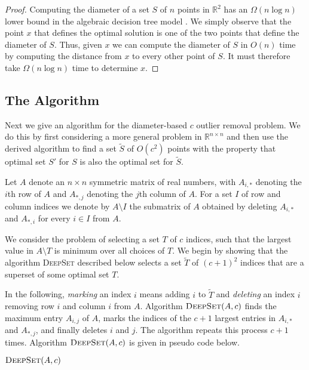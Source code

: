 \documentclass[lotsofwhite]{patmorin}
\newcommand{\RETURN}[1]{\STATE{\textbf{return} #1}}
\begin{document}
\begin{proof}
Computing the diameter of a set $S$ of $n$ points in $\mathbb{R}^2$
has an $\Omega(n\log n)$ lower bound in the algebraic decision tree
model \cite{ps85}.  We simply observe that the point $x$ that defines
the optimal solution is one of the two points that define the diameter
of $S$. Thus, given $x$ we can compute the diameter of $S$ in $O(n)$
time by computing the distance from $x$ to every other point of $S$.
It must therefore take $\Omega(n\log n)$ time to determine $x$. 
\end{proof}


\subsection{The Algorithm}

Next we give an algorithm for the diameter-based $c$ outlier removal
problem.  We do this by first considering a more general problem in
$\mathbb{R}^{n \times n}$ and then use the derived algorithm to find a
set $\tilde{S}$ of $O(c^2)$ points with the property that optimal set
$S'$ for $S$ is also the optimal set for $\tilde{S}$. 

Let $A$ denote an $n\times n$ symmetric matrix of real numbers, with
$A_{i,*}$ denoting the $i$th row of $A$ and $A_{*,j}$ denoting the
$j$th column of $A$.  For a set $I$ of row and column indices we
denote by $A\setminus I$ the submatrix of $A$ obtained by deleting
$A_{i,*}$ and $A_{*,i}$ for every $i\in I$ from $A$.

We consider the problem of selecting a set $T$ of $c$ indices, such
that the largest value in $A\setminus T$ is minimum over all choices
of $T$.  We begin by showing that the algorithm \textsc{DeepSet}
described below selects a set $\tilde{T}$ of $(c+1)^2$ indices that
are a superset of some optimal set $T$.

In the following, \emph{marking} an index $i$ means adding $i$ to
$\tilde{T}$ and \emph{deleting} an index $i$ removing row $i$ and
column $i$ from $A$.  Algorithm $\textsc{DeepSet}(A,c)$ finds the
maximum entry $A_{i,j}$ of $A$, marks the indices of the $c+1$ largest
entries in $A_{i,*}$ and $A_{*,j}$, and finally deletes $i$ and $j$.
The algorithm repeats this process $c+1$ times.  Algorithm
$\textsc{DeepSet}(A,c)$ is given in pseudo code below.

\noindent
\begin{minipage}{\textwidth}
\noindent$\textsc{DeepSet}(A,c)$
\begin{algorithmic}[1]
\ENDFOR
\RETURN{$\tilde{T}$}
\end{algorithmic}
\end{minipage}
\vspace{\parskip}
\end{document}
